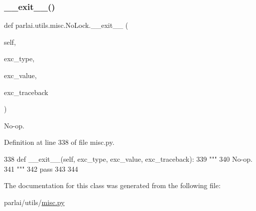 \subsubsection{\texorpdfstring{\+\_\+\+\_\+exit\+\_\+\+\_\+()}{\_\_exit\_\_()}}
{\footnotesize\ttfamily def parlai.\+utils.\+misc.\+No\+Lock.\+\_\+\+\_\+exit\+\_\+\+\_\+ (\begin{DoxyParamCaption}\item[{}]{self,  }\item[{}]{exc\+\_\+type,  }\item[{}]{exc\+\_\+value,  }\item[{}]{exc\+\_\+traceback }\end{DoxyParamCaption})}

\begin{DoxyVerb}No-op.
\end{DoxyVerb}
 

Definition at line 338 of file misc.\+py.


\begin{DoxyCode}
338     \textcolor{keyword}{def }\_\_exit\_\_(self, exc\_type, exc\_value, exc\_traceback):
339         \textcolor{stringliteral}{"""}
340 \textcolor{stringliteral}{        No-op.}
341 \textcolor{stringliteral}{        """}
342         \textcolor{keywordflow}{pass}
343 
344 
\end{DoxyCode}


The documentation for this class was generated from the following file\+:\begin{DoxyCompactItemize}
\item 
parlai/utils/\hyperlink{misc_8py}{misc.\+py}\end{DoxyCompactItemize}
